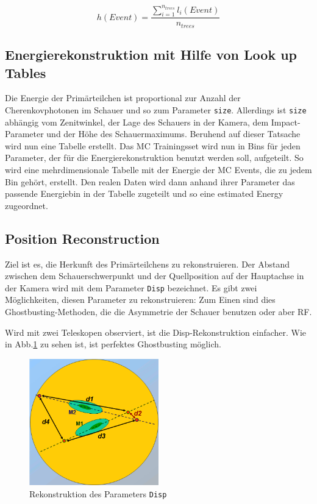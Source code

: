 \begin{equation}
 h(Event)=\frac{ \sum_{i=1} ^{n_{trees}} l_i(Event)}{n_{trees}}
\end{equation}



\subsection{Energierekonstruktion mit Hilfe von Look up Tables}
Die Energie der Primärteilchen ist proportional zur Anzahl der Cherenkovphotonen im Schauer und so zum Parameter \texttt{size}.
Allerdings ist \texttt{size} abhängig vom Zenitwinkel, der Lage des Schauers in der Kamera, dem Impact-Parameter und der Höhe des Schauermaximums.
Beruhend auf dieser Tatsache wird nun eine Tabelle erstellt.
Das MC Trainingsset wird nun in Bins für jeden Parameter, der für die Energierekonstruktion benutzt werden soll, aufgeteilt.
So wird eine mehrdimensionale Tabelle mit der Energie der MC Events, die zu jedem Bin gehört, erstellt.
Den realen Daten wird dann anhand ihrer Parameter das passende Energiebin in der Tabelle zugeteilt und so eine estimated Energy zugeordnet.


\subsection{Position Reconstruction}
Ziel ist es, die Herkunft des Primärteilchens zu rekonstruieren. 
Der Abstand zwischen dem Schauerschwerpunkt und der Quellposition auf der Hauptachse in der Kamera wird mit dem Parameter \texttt{Disp} bezeichnet.
Es gibt zwei Möglichkeiten, diesen Parameter zu rekonstruieren: Zum Einen sind dies Ghostbusting-Methoden, die die Asymmetrie der Schauer benutzen oder aber RF.

Wird mit zwei Teleskopen observiert, ist die Disp-Rekonstruktion einfacher.
Wie in Abb.\ref{Disp} zu sehen ist, ist perfektes Ghostbusting möglich.

\begin{figure}
    \centering
    \includegraphics[width=0.5\textwidth]{./Plots/Disp.png}
    \caption{Rekonstruktion des Parameters \texttt{Disp}}
    \label{Disp}
\end{figure}

